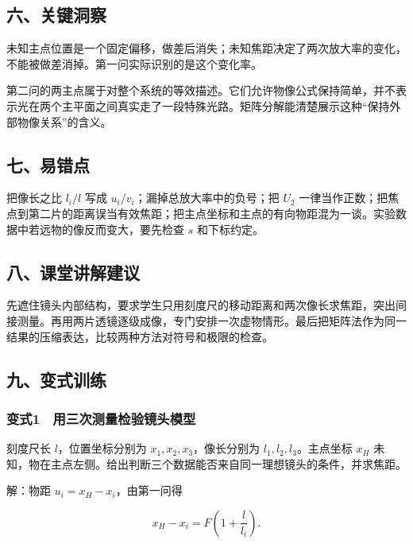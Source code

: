 \documentclass[12pt,a4paper,fontset=fandol]{ctexart}
\begin{document}
\subsection{六、关键洞察}\label{ux516dux5173ux952eux6d1eux5bdf}

未知主点位置是一个固定偏移，做差后消失；未知焦距决定了两次放大率的变化，不能被做差消掉。第一问实际识别的是这个变化率。

第二问的两主点属于对整个系统的等效描述。它们允许物像公式保持简单，并不表示光在两个主平面之间真实走了一段特殊光路。矩阵分解能清楚展示这种``保持外部物像关系''的含义。

\subsection{七、易错点}\label{ux4e03ux6613ux9519ux70b9}

把像长之比 \(l_i/l\) 写成 \(u_i/v_i\)；漏掉总放大率中的负号；把 \(U_2\)
一律当作正数；把焦点到第二片的距离误当有效焦距；把主点坐标和主点的有向物距混为一谈。实验数据中若远物的像反而变大，要先检查
\(s\) 和下标约定。

\subsection{八、课堂讲解建议}\label{ux516bux8bfeux5802ux8bb2ux89e3ux5efaux8bae}

先遮住镜头内部结构，要求学生只用刻度尺的移动距离和两次像长求焦距，突出间接测量。再用两片透镜逐级成像，专门安排一次虚物情形。最后把矩阵法作为同一结果的压缩表达，比较两种方法对符号和极限的检查。

\subsection{九、变式训练}\label{ux4e5dux53d8ux5f0fux8badux7ec3}

\subsubsection{变式1　用三次测量检验镜头模型}\label{ux53d8ux5f0f1-ux7528ux4e09ux6b21ux6d4bux91cfux68c0ux9a8cux955cux5934ux6a21ux578b}

刻度尺长 \(l\)，位置坐标分别为 \(x_1,x_2,x_3\)，像长分别为
\(l_1,l_2,l_3\)。主点坐标 \(x_H\)
未知，物在主点左侧。给出判断三个数据能否来自同一理想镜头的条件，并求焦距。

解：物距 \(u_i=x_H-x_i\)，由第一问得

\[x_H-x_i=F\left(1+\frac l{l_i}\right).\]
\end{document}
